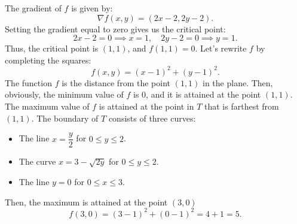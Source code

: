 \documentclass[11pt]{article}
\begin{document}
The gradient of \(f\) is given by:
\[\nabla f(x, y) = (2x - 2, 2y - 2).\]
Setting the gradient equal to zero gives us the critical point:
\[2x - 2 = 0 \implies x = 1, \quad 2y - 2 = 0 \implies y = 1.\]
Thus, the critical point is \((1, 1)\), and \(f(1,1) = 0\). Let's rewrite \(f\) by completing the squares:
\[f(x, y) = (x - 1)^2 + (y - 1)^2.\]
The function \(f\) is the distance from the point \((1, 1)\) in the plane. Then, obviously, the minimum value of \(f\) is 0, and it is attained at the point \((1, 1)\). The maximum value of \(f\) is attained at the point in \(T\) that is farthest from \((1, 1)\). The boundary of \(T\) consists of three curves:
\begin{itemize}
    \item The line \(x = \dfrac{y}{2}\) for \(0 \leq y \leq 2\).
    \item The curve \(x = 3 - \sqrt{2y}\) for \(0 \leq y \leq 2\).
    \item The line \(y = 0\) for \(0 \leq x \leq 3\).
\end{itemize}

Then, the maximum is attained at the point \((3, 0)\)
\[f(3, 0) = (3 - 1)^2 + (0 - 1)^2 = 4 + 1 = 5.\]

\pagebreak
\end{document}
